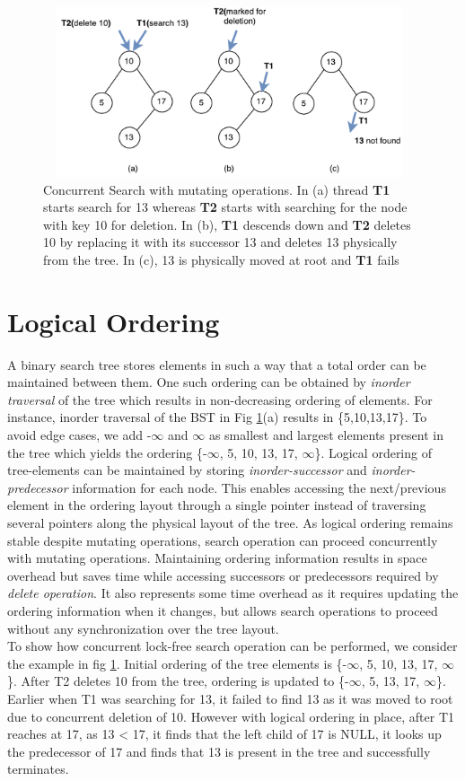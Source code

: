 \documentclass[MTech]{iitmdiss}
\begin{document}
\begin{figure}
\centering 
\includegraphics[width=11cm,height=5cm]{Concurrent_Search}
\caption{Concurrent Search with mutating operations. In (a) thread \textbf{T1} starts search for 13 whereas \textbf{T2} starts with searching for the node with key 10 for deletion. In (b), \textbf{T1} descends down and \textbf{T2} deletes 10 by replacing it with its successor 13 and deletes 13 physically from the tree. In (c), 13 is physically moved at root and \textbf{T1} fails}
\label{fig:concurrent_search}
\end{figure}

\section{Logical Ordering}
A binary search tree stores elements in such a way that a total order can be maintained between them. One such ordering can be obtained by \textit{inorder traversal} of the tree which results in non-decreasing ordering of elements. For instance, inorder traversal of the BST in Fig \ref{fig:concurrent_search}(a) results in \{5,10,13,17\}. To avoid edge cases, we add -$\infty$ and $\infty$ as smallest and largest elements present in the tree which yields the ordering \{-$\infty$, 5, 10, 13, 17, $\infty$\}. Logical ordering of tree-elements can be maintained by storing \textit{inorder-successor} and \textit{inorder-predecessor} information for each node. This enables accessing the next/previous element in the ordering layout through a single pointer instead of traversing several pointers along the physical layout of the tree. As logical ordering remains stable despite mutating operations, search operation can proceed concurrently with mutating operations. Maintaining ordering information results in space overhead but saves time while accessing successors or predecessors required by \textit{delete operation}. It also represents some time overhead as it requires updating the ordering information when it changes, but allows search operations to proceed without any synchronization over the tree layout. \\
\indent  To show how concurrent lock-free search operation can be performed, we consider the example in fig \ref{fig:concurrent_search}. Initial ordering of the tree elements is \{-$\infty$, 5, 10, 13, 17, $\infty$\}. After T2 deletes 10 from the tree, ordering is updated to \{-$\infty$, 5, 13, 17, $\infty$\}. Earlier when T1 was searching for 13, it failed to find 13 as it was moved to root due to concurrent deletion of 10. However with logical ordering in place, after T1 reaches at 17, as 13 < 17, it finds that the left child of 17 is NULL, it looks up the predecessor of 17 and finds that 13 is present in the tree and successfully terminates. 
\end{document}
